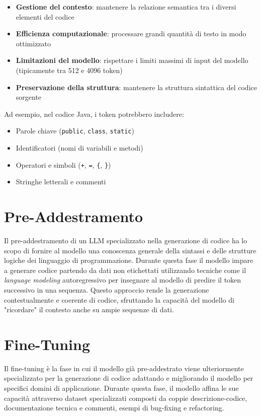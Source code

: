 \documentclass[12pt,a4paper,openright,twoside]{book}
\begin{document}
\begin{itemize}
    \item \textbf{Gestione del contesto}: mantenere la relazione semantica tra i diversi elementi del codice
    \item \textbf{Efficienza computazionale}: processare grandi quantità di testo in modo ottimizzato
    \item \textbf{Limitazioni del modello}: rispettare i limiti massimi di input del modello (tipicamente tra 512 e 4096 token)
    \item \textbf{Preservazione della struttura}: mantenere la struttura sintattica del codice sorgente
\end{itemize}

Ad esempio, nel codice Java, i token potrebbero includere:
\begin{itemize}
    \item Parole chiave (\texttt{public}, \texttt{class}, \texttt{static})
    \item Identificatori (nomi di variabili e metodi)
    \item Operatori e simboli (\texttt{+}, \texttt{=}, \texttt{\{}, \texttt{\}})
    \item Stringhe letterali e commenti
\end{itemize}
\section{Pre-Addestramento}
Il pre-addestramento di un LLM specializzato nella generazione di codice ha lo scopo di fornire al modello una conoscenza generale della sintassi e delle strutture logiche dei linguaggio di programmazione.
Durante questa fase il modello impare a generare codice partendo da dati non etichettati utilizzando tecniche come il \emph{language modeling} autoregressivo per insegnare al modello di predire il token successivo in una sequenza.
Questo approccio rende la generazione contestualmente e coerente di codice, sfruttando la capacità del modello di "ricordare" il contesto anche su ampie sequenze di dati.
\section{Fine-Tuning}
Il fine-tuning è la fase in cui il modello già pre-addestrato viene ulteriormente specializzato per la generazione di codice adattando e migliorando il modello per specifici domini di applicazione.
Durante questa fase, il modello affina le sue capacità attraverso dataset specializzati composti da coppie descrizione-codice, documentazione tecnica e commenti, esempi di bug-fixing e refactoring.
\end{document}
